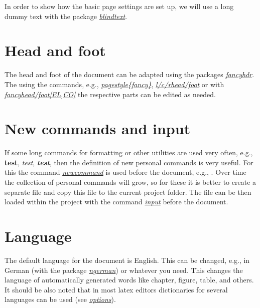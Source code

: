 \documentclass[a4paper]{book}
\newcommand{\imp}[1]{\underline{\textit{#1}}}
\begin{document}
In order to show how the basic page settings are set up, we will use a long dummy text with the package \imp{blindtext}.

\blindtext[6]

\blindtext

\blindtext[7]


\section{Head and foot}

The head and foot of the document can be adapted using the packages \imp{fancyhdr}. The using the commands, e.g., \imp{pagestyle\{fancy\}}, \imp{l/c/rhead/foot} or with \imp{fancyhead/foot[EL,CO]} the respective parts can be edited as needed.


\section{New commands and input}

If some long commands for formatting or other utilities are used very often, e.g., \textbf{test}, \textit{test}, \textbf{\textit{test}}, then the definition of new personal commands is very useful. For this the command \imp{newcommand} is used before the document, e.g., . Over time the collection of personal commands will grow, so for these it is better to create a separate file and copy this file to the current project folder. The file can be then loaded within the project with the command \imp{input} before the document.


\section{Language}

The default language for the document is English. This can be changed, e.g., in German (with the package \imp{ngerman}) or whatever you need. This changes the language of automatically generated words like chapter, figure, table, and others. It should be also noted that in most latex editors dictionaries for several languages can be used (see \imp{options}).
\end{document}
